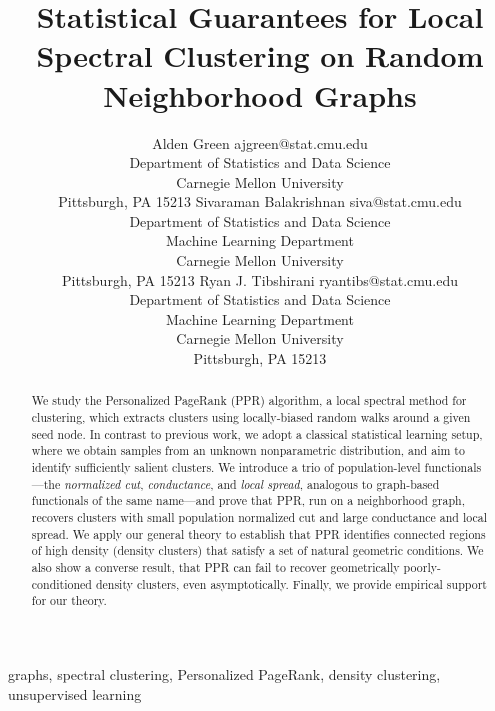 \documentclass[11pt,twoside]{article}
\newcommand{\1}{\mathbf{1}}
\begin{document}
	
\title{Statistical Guarantees for Local Spectral Clustering on Random Neighborhood Graphs}

\author{\name Alden Green \email ajgreen@stat.cmu.edu \\
	\addr Department of Statistics and Data Science\\
	Carnegie Mellon University\\
	Pittsburgh, PA 15213
	\AND
	\name Sivaraman Balakrishnan \email siva@stat.cmu.edu \\
	\addr Department of Statistics and Data Science\\
	Machine Learning Department\\
	Carnegie Mellon University\\
	Pittsburgh, PA 15213
	\AND
	Ryan J. Tibshirani \email ryantibs@stat.cmu.edu \\
	\addr Department of Statistics and Data Science\\
	Machine Learning Department\\
	Carnegie Mellon University\\
	Pittsburgh, PA 15213}

\maketitle

\begin{abstract}
	We study the Personalized PageRank (PPR) algorithm, a local spectral method for clustering, which extracts clusters using locally-biased random walks around a given seed node.  In contrast to previous work, we adopt a classical statistical learning setup, where we obtain samples from an unknown nonparametric distribution, and aim to identify sufficiently salient clusters.  We introduce a trio of population-level functionals---the \emph{normalized cut}, \emph{conductance}, and \emph{local spread}, analogous to graph-based functionals of the same name---and prove that PPR, run on a neighborhood graph, recovers clusters with small population normalized cut and large conductance and local spread. We apply our general theory to establish that PPR identifies connected regions of high density (density clusters) that satisfy a set of natural geometric conditions. We also show a converse result, that PPR can fail to recover geometrically poorly-conditioned density clusters, even asymptotically. Finally, we provide empirical support for our theory.
\end{abstract}

\begin{keywords}
	graphs, spectral clustering, Personalized PageRank, density clustering, unsupervised learning
\end{keywords}
\end{document}
